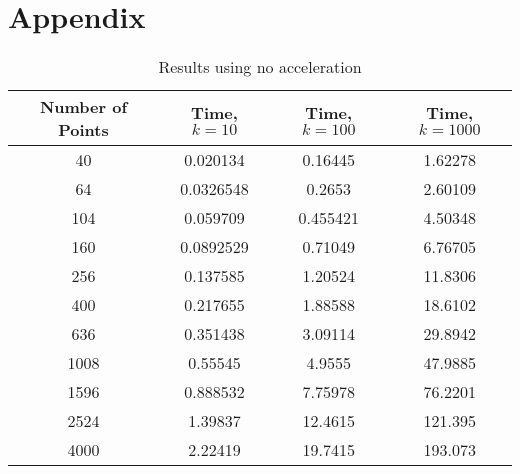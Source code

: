 
\section{Appendix}

\begin{table}[ht!]
    \centering
    {\footnotesize
        \begin{tabular}{| c | c c c |}
            \hline
            Number of Points  &  Time, $k=10$  & Time, $k=100$  &  Time, $k=1000$ \\
            \hline
            40  &  0.020134   &    0.16445     &     1.62278 \\
            64  &  0.0326548  &    0.2653      &     2.60109 \\
            104  &  0.059709   &    0.455421    &     4.50348 \\ 
            160  &  0.0892529  &    0.71049     &     6.76705 \\
            256  &  0.137585   &    1.20524     &    11.8306 \\
            400  &  0.217655   &    1.88588     &    18.6102 \\
            636  &  0.351438   &    3.09114     &    29.8942 \\
            1008  &  0.55545    &    4.9555      &    47.9885 \\
            1596  &  0.888532   &    7.75978     &    76.2201 \\
            2524  &  1.39837    &   12.4615      &   121.395 \\
            4000  &  2.22419    &   19.7415      &   193.073 \\
            \hline
        \end{tabular}
    }
    \caption{Results using no acceleration}
    \label{tb:nothing}
\end{table}

